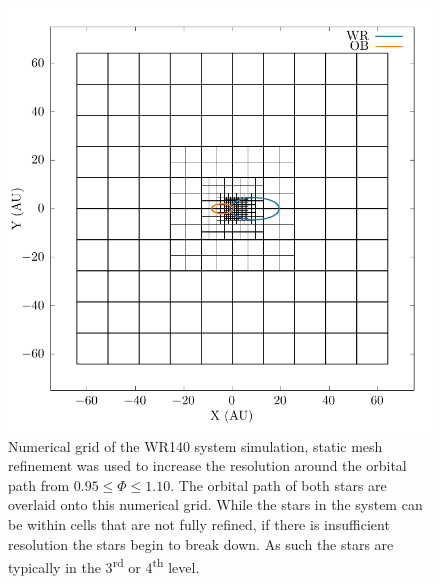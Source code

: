 \documentclass[fleqn,usenatbib]{mnras}
\newcommand{\ts}{\textsuperscript}
\begin{document}
\begin{figure}
  \centering
  \includegraphics[width=0.8\linewidth]{assets/wr140-grid/grid-orbit.pdf}
  \caption{Numerical grid of the WR140 system simulation, static mesh refinement was used to increase the resolution around the orbital path from $0.95 \leq \Phi \leq 1.10$. The orbital path of both stars are overlaid onto this numerical grid. While the stars in the system can be within cells that are not fully refined, if there is insufficient resolution the stars begin to break down. As such the stars are typically in the 3\ts{rd} or 4\ts{th} level.}
  \label{fig:p2-orbitalpath}
\end{figure}

\end{document}
